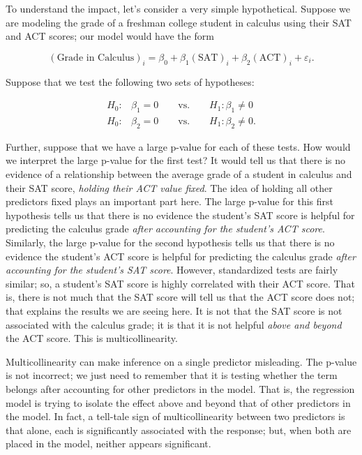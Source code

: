 \documentclass[
]{book}
\theoremstyle{plain}
\theoremstyle{mydefn}
\theoremstyle{myexmpl}
\theoremstyle{remark}
\begin{document}
To understand the impact, let's consider a very simple hypothetical. Suppose we are modeling the grade of a freshman college student in calculus using their SAT and ACT scores; our model would have the form

\[(\text{Grade in Calculus})_i = \beta_0 + \beta_1(\text{SAT})_i + \beta_2(\text{ACT})_i + \varepsilon_i.\]

Suppose that we test the following two sets of hypotheses:

\[
\begin{aligned}
  H_0:& \beta_1 = 0 \qquad \text{vs.} \qquad H_1: \beta_1 \neq 0 \\
  H_0:& \beta_2 = 0 \qquad \text{vs.} \qquad H_1: \beta_2 \neq 0.
\end{aligned}
\]

Further, suppose that we have a large p-value for each of these tests. How would we interpret the large p-value for the first test? It would tell us that there is no evidence of a relationship between the average grade of a student in calculus and their SAT score, \emph{holding their ACT value fixed}. The idea of holding all other predictors fixed plays an important part here. The large p-value for this first hypothesis tells us that there is no evidence the student's SAT score is helpful for predicting the calculus grade \emph{after accounting for the student's ACT score}. Similarly, the large p-value for the second hypothesis tells us that there is no evidence the student's ACT score is helpful for predicting the calculus grade \emph{after accounting for the student's SAT score}. However, standardized tests are fairly similar; so, a student's SAT score is highly correlated with their ACT score. That is, there is not much that the SAT score will tell us that the ACT score does not; that explains the results we are seeing here. It is not that the SAT score is not associated with the calculus grade; it is that it is not helpful \emph{above and beyond} the ACT score. This is multicollinearity.

Multicollinearity can make inference on a single predictor misleading. The p-value is not incorrect; we just need to remember that it is testing whether the term belongs after accounting for other predictors in the model. That is, the regression model is trying to isolate the effect above and beyond that of other predictors in the model. In fact, a tell-tale sign of multicollinearity between two predictors is that alone, each is significantly associated with the response; but, when both are placed in the model, neither appears significant.
\end{document}
